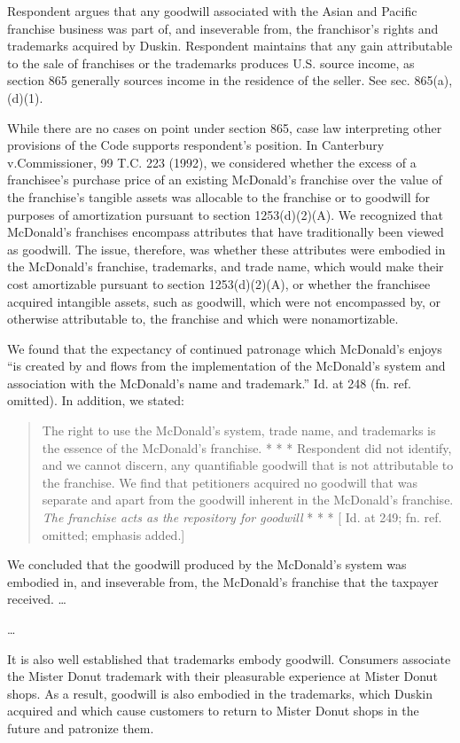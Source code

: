 \begin{select}
Respondent argues that any goodwill associated with the Asian and Pacific franchise business was part of, and inseverable from, the franchisor's rights and trademarks acquired by Duskin. Respondent maintains that any gain attributable to the sale of franchises or the trademarks produces U.S. source income, as section 865 generally sources income in the residence of the seller. See sec. 865(a), (d)(1).

While there are no cases on point under section 865, case law interpreting other provisions of the Code supports
respondent's position. In Canterbury v.\@ Commissioner, 99 T.C. 223 (1992), we considered whether the excess of a
franchisee's purchase price of an existing McDonald's franchise over the value of the franchise's tangible assets was
allocable to the franchise or to goodwill for purposes of amortization pursuant to section 1253(d)(2)(A). We recognized
that McDonald's franchises encompass attributes that have traditionally been viewed as goodwill. The issue, therefore,
was whether these attributes were embodied in the McDonald's franchise, trademarks, and trade name, which would
make their cost amortizable pursuant to section 1253(d)(2)(A), or whether the franchisee acquired intangible assets,
such as goodwill, which were not encompassed by, or otherwise attributable to, the franchise and which were
nonamortizable.

We found that the expectancy of continued patronage which McDonald's enjoys ``is created by and flows from the
implementation of the McDonald's system and association with the McDonald's name and trademark.'' Id. at 248 (fn. ref.
omitted). In addition, we stated:
\begin{quote}
The right to use the McDonald's system, trade name, and trademarks is the essence of the McDonald's
franchise. * * * Respondent did not identify, and we cannot discern, any quantifiable goodwill that is not
attributable to the franchise. We find that petitioners acquired no goodwill that was separate and apart from
the goodwill inherent in the McDonald's franchise.\\
\textit{The franchise acts as the repository for goodwill} * * * [ Id. at 249; fn. ref. omitted; emphasis added.]
\end{quote}
We concluded that the goodwill produced by the McDonald's system was embodied in, and inseverable from, the
McDonald's franchise that the taxpayer received. \ldots

\ldots

It is also well established that trademarks embody goodwill. Consumers associate the Mister Donut trademark with their pleasurable
experience at Mister Donut shops. As a result, goodwill is also embodied in the trademarks, which Duskin acquired and
which cause customers to return to Mister Donut shops in the future and patronize them.


\end{select}
